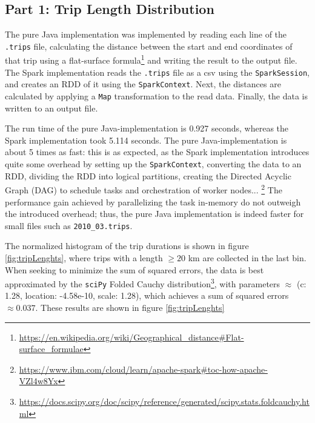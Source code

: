 \documentclass[11pt]{article}
\title{\vspace{-2.5cm}{\myfont Report Project 2: BDAP [B-KUL-H00Y4A]}}
\author{Andreas Hinderyckx}
\date{\vspace{-.2cm}April 2022}
\begin{document}
\maketitle

\vspace{-1cm}
\subsection*{Part 1: Trip Length Distribution}
The pure Java implementation was implemented by reading each line of the \texttt{.trips} file, calculating the distance between the start and end coordinates of that trip using a flat-surface formula\footnote{\url{https://en.wikipedia.org/wiki/Geographical_distance\#Flat-surface_formulae}} and writing the result to the output file. The Spark implementation reads the \texttt{.trips} file as a csv using the \texttt{SparkSession}, and creates an RDD of it using the \texttt{SparkContext}. Next, the distances are calculated by applying a \texttt{Map} transformation to the read data. Finally, the data is written to an output file.

The run time of the pure Java-implementation is 0.927 seconds, whereas the Spark implementation took 5.114 seconds. The pure Java-implementation is about 5 times as fast: this is as expected, as the Spark implementation introduces quite some overhead by setting up the \texttt{SparkContext}, converting the data to an RDD, dividing the RDD into logical partitions, creating the Directed Acyclic Graph (DAG) to schedule tasks and orchestration of worker nodes... \footnote{\url{https://www.ibm.com/cloud/learn/apache-spark\#toc-how-apache-VZl4w8Yx}} The performance gain achieved by parallelizing the task in-memory do not outweigh the introduced overhead; thus, the pure Java implementation is indeed faster for small files such as \texttt{2010\_03.trips}.

The normalized histogram of the trip durations is shown in figure \ref{fig:tripLenghts}, where trips with a length $\geq20$ km are collected in the last bin. When seeking to minimize the sum of squared errors, the data is best approximated by the \texttt{sciPy} Folded Cauchy distribution\footnote{\url{https://docs.scipy.org/doc/scipy/reference/generated/scipy.stats.foldcauchy.html}}, with parameters $\approx$ (c: 1.28, location: -4.58e-10, scale: 1.28), which achieves a sum of squared errors $\approx 0.037$. These results are shown in figure \ref{fig:tripLenghts}
\end{document}
